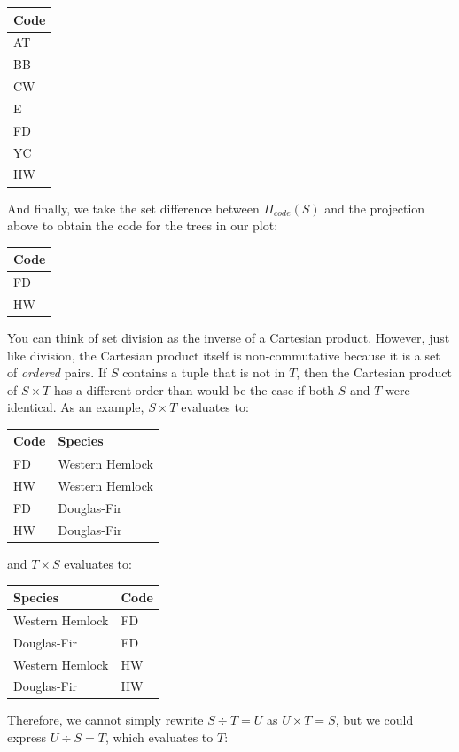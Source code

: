 \documentclass[
]{book}
\begin{document}
\begin{tabular}{l}
\toprule
Code\\
\midrule
AT\\
BB\\
CW\\
E\\
FD\\
\addlinespace
YC\\
HW\\
\bottomrule
\end{tabular}

And finally, we take the set difference between \(Π_{code}(S)\) and the projection above to obtain the code for the trees in our plot:

\begin{tabular}{l}
\toprule
Code\\
\midrule
FD\\
HW\\
\bottomrule
\end{tabular}

You can think of set division as the inverse of a Cartesian product. However, just like division, the Cartesian product itself is non-commutative because it is a set of \emph{ordered} pairs. If \(S\) contains a tuple that is not in \(T\), then the Cartesian product of \(S×T\) has a different order than would be the case if both \(S\) and \(T\) were identical. As an example, \(S×T\) evaluates to:

\begin{tabular}{ll}
\toprule
Code & Species\\
\midrule
FD & Western Hemlock\\
HW & Western Hemlock\\
FD & Douglas-Fir\\
HW & Douglas-Fir\\
\bottomrule
\end{tabular}

and \(T×S\) evaluates to:

\begin{tabular}{ll}
\toprule
Species & Code\\
\midrule
Western Hemlock & FD\\
Douglas-Fir & FD\\
Western Hemlock & HW\\
Douglas-Fir & HW\\
\bottomrule
\end{tabular}

Therefore, we cannot simply rewrite \(S÷T=U\) as \(U×T=S\), but we could express \(U÷S=T\), which evaluates to \(T\):
\end{document}

